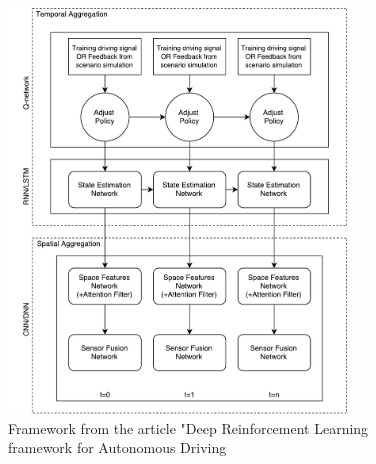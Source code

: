 \begin{figure}[H]
	\centering
	\includegraphics[width=0.8\textwidth]{Figures/TheoreticalBackground/Framework_article}
	\caption{Framework from the article "Deep Reinforcement Learning framework for Autonomous Driving}
	\label{fig:Framework_article}
\end{figure}
 